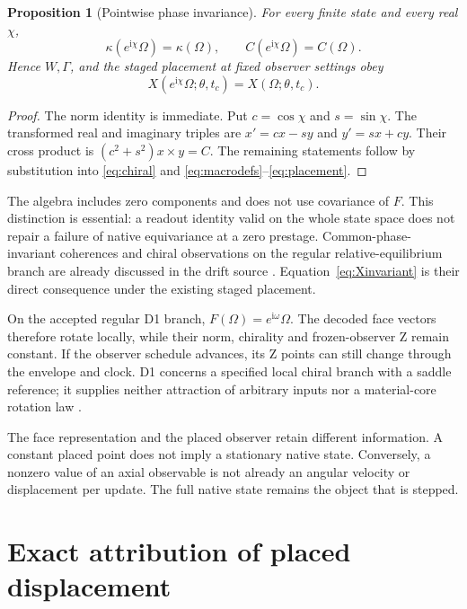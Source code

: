 \documentclass[11pt,a4paper]{article}
\numberwithin{equation}{section}
\newtheorem{proposition}{Proposition}[section]
\theoremstyle{definition}
\theoremstyle{remark}
\newcommand{\iu}{\mathrm i}
\begin{document}
\begin{proposition}[Pointwise phase invariance]\label{prop:invariance}
For every finite state and every real $\chi$,
\begin{equation}
\kappa(e^{\iu\chi}\Omega)=\kappa(\Omega),\qquad
C(e^{\iu\chi}\Omega)=C(\Omega).
\end{equation}
Hence $W,\Gamma$, and the staged placement at fixed observer settings obey
\begin{equation}\label{eq:Xinvariant}
\boxed{X(e^{\iu\chi}\Omega;\theta,t_c)=X(\Omega;\theta,t_c).}
\end{equation}
\end{proposition}
\begin{proof}
The norm identity is immediate. Put $c=\cos\chi$ and $s=\sin\chi$.
The transformed real and imaginary triples are $x'=cx-sy$ and $y'=sx+cy$.
Their cross product is $(c^2+s^2)x\times y=C$. The remaining statements
follow by substitution into \eqref{eq:chiral} and
\eqref{eq:macrodefs}--\eqref{eq:placement}.
\end{proof}

The algebra includes zero components and does not use covariance of $F$.
This distinction is essential: a readout identity valid on the whole state
space does not repair a failure of native equivariance at a zero prestage.
Common-phase-invariant coherences and chiral observations on the regular
relative-equilibrium branch are already discussed in the drift source
\cite{Drift}. Equation~\eqref{eq:Xinvariant} is their direct consequence
under the existing staged placement.

On the accepted regular D1 branch,
$F(\Omega)=e^{\iu\omega}\Omega$. The decoded face vectors therefore
rotate locally, while their norm, chirality and frozen-observer Z remain
constant. If the observer schedule advances, its Z points can still change
through the envelope and clock. D1 concerns a specified local chiral branch
with a saddle reference; it supplies neither attraction of arbitrary inputs
nor a material-core rotation law \cite{Drift}.

The face representation and the placed observer retain different
information. A constant placed point does not imply a stationary native
state. Conversely, a nonzero value of an axial observable is not already an
angular velocity or displacement per update. The full native state remains
the object that is stepped.

\section{Exact attribution of placed displacement}\label{sec:attribution}
\end{document}
